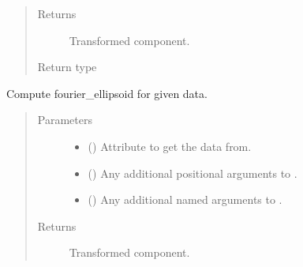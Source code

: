 \documentclass[letterpaper,10pt,english]{sphinxmanual}
\begin{document}
\begin{fulllineitems}
\begin{fulllineitems}
\begin{quote}
\begin{description}
\begin{itemize}
\end{itemize}

\item[{Returns}] \leavevmode
{} \textendash{} Transformed component.

\item[{Return type}] \leavevmode
{\hyperref[\detokenize{api/base_classes:geology.src.base_spatial.SpatialComponent}]{}}

\end{description}\end{quote}

\end{fulllineitems}


\begin{fulllineitems}
\label{\detokenize{api/rock:geology.src.Rock.fourier_ellipsoid}}
Compute fourier\_ellipsoid for given data.
\begin{quote}\begin{description}
\item[{Parameters}] \leavevmode\begin{itemize}
\item {} 
 (\sphinxstyleliteralemphasis{\sphinxupquote{, }}) \textendash{} Attribute to get the data from.

\item {} 
 () \textendash{} Any additional positional arguments to .

\item {} 
 () \textendash{} Any additional named arguments to .

\end{itemize}

\item[{Returns}] \leavevmode
{} \textendash{} Transformed component.


\end{description}
\end{quote}
\end{fulllineitems}
\end{fulllineitems}
\end{document}
